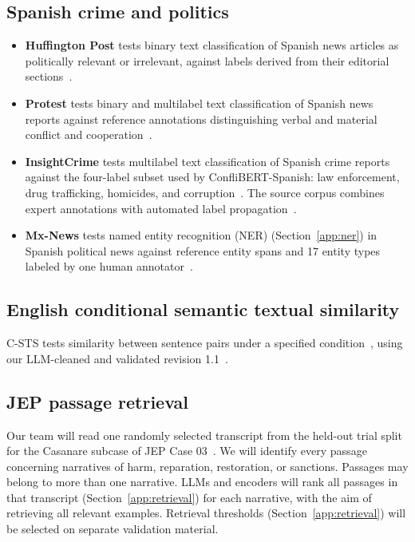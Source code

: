 \documentclass{article}
\begin{document}
\subsection{Spanish crime and politics}

\begin{itemize}
    \item \textbf{Huffington Post} tests binary text classification of Spanish news articles as politically relevant or irrelevant, against labels derived from their editorial sections~\cite{ConfliBERT-Spanish}.
    \item \textbf{Protest} tests binary and multilabel text classification of Spanish news reports against reference annotations distinguishing verbal and material conflict and cooperation~\cite{ConfliBERT-Spanish}.
    \item \textbf{InsightCrime} tests multilabel text classification of Spanish crime reports against the four-label subset used by ConfliBERT-Spanish: law enforcement, drug trafficking, homicides, and corruption~\cite{ConfliBERT-Spanish}. The source corpus combines expert annotations with automated label propagation~\cite{Parolin2021}.
    \item \textbf{Mx-News} tests named entity recognition (NER) (Section~\ref{app:ner}) in Spanish political news against reference entity spans and 17 entity types labeled by one human annotator~\cite{MxNews}.
\end{itemize}

\subsection{English conditional semantic textual similarity}
C-STS tests similarity between sentence pairs under a specified condition~\cite{C-STS}, using our LLM-cleaned and validated revision 1.1~\cite{C-STSCleaned}.

\subsection{JEP passage retrieval}
Our team will read one randomly selected transcript from the held-out trial split for the Casanare subcase of JEP Case 03~\cite{JEPCaso03}. We will identify every passage concerning narratives of harm, reparation, restoration, or sanctions. Passages may belong to more than one narrative. LLMs and encoders will rank all passages in that transcript (Section~\ref{app:retrieval}) for each narrative, with the aim of retrieving all relevant examples. Retrieval thresholds (Section~\ref{app:retrieval}) will be selected on separate validation material.
\end{document}
